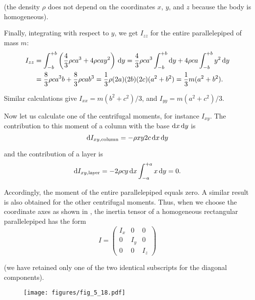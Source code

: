 \noindent
(the density $\rho$ does not depend on the coordinates $x$, $y$, and $z$ because the body is homogeneous).

Finally, integrating  with respect to $y$, we get $I_{zz}$ for the entire parallelepiped of mass $m$:
\begin{align*}
I_{zz} &= \int_{-b}^{+b} \left(\frac{4}{3}\rho ca^3+4\rho cay^2\right)\,\mathrm{d} y = \frac{4}{3}\rho ca^3 \int_{-b}^{+b}\mathrm{d} y + 4\rho ca \int_{-b}^{+b} y^2 \,\mathrm{d} y\\
&= \frac{8}{3}\rho ca^3b + \frac{8}{3}\rho cab^3 = \frac{1}{3} \rho (2a)(2b)(2c)(a^2+b^2) = \frac{1}{3}m(a^2+b^2).
\end{align*}

\noindent
Similar calculations give $I_{xx}=m(b^2+c^2)/3$, and $I_{yy}=m(a^2+c^2)/3$.

Now let us calculate one of the centrifugal moments, for instance $I_{xy}$. The contribution to this moment of a column with the base $\mathrm{d} x\,\mathrm{d} y$ is
\begin{equation*}
\mathrm{d} I_{xy,\text{column}} = -\rho xy2c\,\mathrm{d} x\,\mathrm{d} y
\end{equation*}

\noindent
and the contribution of a layer is
\begin{equation*}
\mathrm{d} I_{xy,\text{layer}} = -2\rho cy\,\mathrm{d} x \int_{-a}^{+a}x\,\mathrm{d} y = 0.
\end{equation*}

\noindent
Accordingly, the moment of the entire parallelepiped equals zero. A similar result is also obtained for the other centrifugal moments. Thus, when we choose the coordinate axes as shown in , the inertia tensor of a homogeneous rectangular parallelepiped has the form
\begin{equation}\label{eq:5_43}
	I = \begin{pmatrix}
		I_x&0&0\\
		0&I_y&0\\
		0&0&I_z
	\end{pmatrix}
\end{equation}

\noindent
(we have retained only one of the two identical subscripts for the diagonal components).

\begin{figure}[t]
	\begin{center}
		\texttt{[image: figures/fig\_5\_18.pdf]}
		\caption[]{}
		\label{fig:5_18}
	\end{center}
	\vspace{-0.9cm}
\end{figure}

